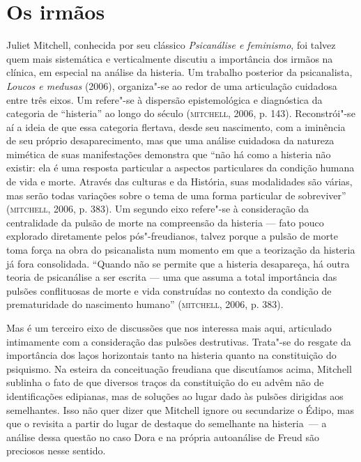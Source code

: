 \section{Os irmãos}

Juliet Mitchell, conhecida por seu clássico \emph{Psicanálise e
feminismo}, foi talvez quem mais sistemática e verticalmente discutiu a
importância dos irmãos na clínica, em especial na análise da histeria.
Um trabalho posterior da psicanalista, \emph{Loucos e medusas}
(2006), organiza"-se ao redor de uma articulação cuidadosa entre
três eixos. Um refere"-se à dispersão epistemológica e diagnóstica da
categoria de ``histeria'' ao longo do século  (\textsc{mitchell}, 2006, p.
143). Reconstrói"-se aí a ideia de que essa categoria flertava, desde seu
nascimento, com a iminência de seu próprio desaparecimento, mas que uma
análise cuidadosa da natureza mimética de suas manifestações demonstra
que ``não há como a histeria não existir: ela é uma resposta particular
a aspectos particulares da condição humana de vida e morte. Através das
culturas e da História, suas modalidades são várias, mas serão todas
variações sobre o tema de uma forma particular de sobreviver''
(\textsc{mitchell}, 2006, p. 383). Um segundo eixo refere"-se à consideração
da centralidade da pulsão de morte na compreensão da histeria --- fato
pouco explorado diretamente pelos pós"-freudianos, talvez porque a pulsão
de morte toma força na obra do psicanalista num momento em que a
teorização da histeria já fora consolidada. ``Quando não se permite que
a histeria desapareça, há outra teoria de psicanálise a ser escrita ---
uma que assuma a total importância das pulsões conflituosas de morte e
vida construídas no contexto da condição de prematuridade do nascimento
humano'' (\textsc{mitchell}, 2006, p. 383).

Mas é um terceiro eixo de discussões que nos interessa mais aqui,
articulado intimamente com a consideração das pulsões destrutivas.
Trata"-se do resgate da importância dos laços horizontais tanto na
histeria quanto na constituição do psiquismo. Na esteira da conceituação
freudiana que discutíamos acima, Mitchell sublinha o fato de que
diversos traços da constituição do eu advêm não de identificações
edipianas, mas de soluções ao lugar dado às pulsões dirigidas aos
semelhantes. Isso não quer dizer que Mitchell ignore ou secundarize o
Édipo, mas que o revisita a partir do lugar de destaque do semelhante na
histeria~--- a análise dessa questão no caso Dora e na própria
autoanálise de Freud são preciosos nesse sentido.

